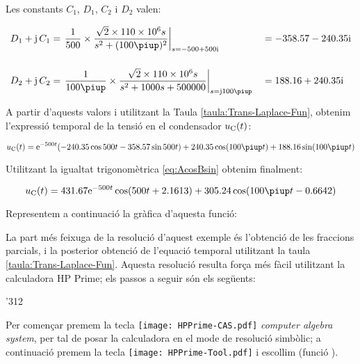 \begin{exemple}
    Les constants $C_1$, $D_1$,  $C_2$ i $D_2$ valen:

    \begin{alignat*}{2}
        D_1 + \ju\,C_1 &= \left.\frac{1}{500}\times \frac{\sqrt{2}\times 110\times 10^6 s}
        {s^2 +(100\piup)^2}\right|_{s=\complexnum{-500+j500}} &&= \complexnum{-358,57 -j 240,35}\\[3ex]
        D_2 + \ju\,C_2 &= \left.\frac{1}{100\piup}\times\frac{\sqrt{2}\times 110\times 10^6 s}
        {s^2 + 1000 s + 500000}\right|_{s=\ju 100\piup} &&= \complexnum{188,16 + j240,35}
    \end{alignat*}

    A partir d'aquests valors i utilitzant la Taula
    \vref{taula:Trans-Laplace-Fun}, obtenim l'expressió temporal de la
    tensió en el condensador $u_\mathrm{C}(t)$:

    \[
        u\ped{C}(t) = \eu^{-500t} (\num{-240,35} \cos 500 t - \num{358,57} \sin 500
        t) + \num{240,35} \cos (100\piup t) + \num{188,16} \sin( 100\piup
        t)
    \]

    Utilitzant la igualtat trigonomètrica \eqref{eq:AcosBsin} obtenim finalment:

    \[
        u\ped{C}(t)= \num{431,67} \eu^{-500t} \cos(500 t +\num{2,1613}) + \num{305,24} \cos (100\piup t - \num{0,6642})
    \]

    Representem a continuació la gràfica d'aquesta
    funció:

    \begin{center}
      
    \end{center}

    La part més feixuga de la resolució d'aquest exemple és l'obtenció de les fraccions parcials, i la posterior obtenció de l'equació temporal utilitzant la taula \ref{taula:Trans-Laplace-Fun}. Aquesta resolució resulta força més fàcil utilitzant la calculadora \textsf{HP Prime};
    els passos a seguir són els següents:

    \begin{dingautolist}{'312}

        \item Per començar premem la tecla \texttt{[image: HPPrime-CAS.pdf]} \textit{computer algebra system}, per tal de posar la calculadora en el mode de resolució simbòlic; a continuació premem la tecla \texttt{[image: HPPrime-Tool.pdf]} i escollim  (funció ).


\end{dingautolist}
\end{exemple}
